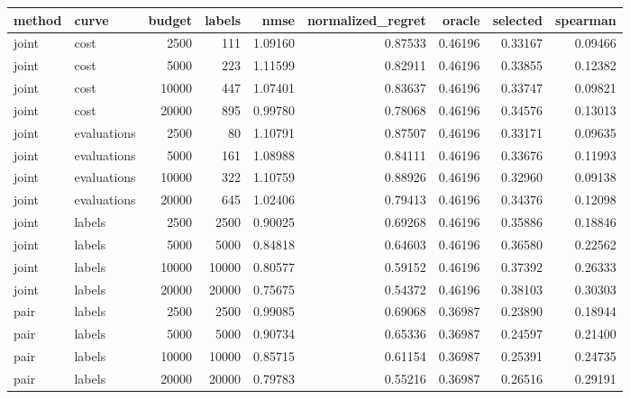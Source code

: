 \begin{tabular}{llrrrrrrr}
\toprule
method & curve & budget & labels & nmse & normalized_regret & oracle & selected & spearman \\
\midrule
joint & cost & 2500 & 111 & 1.09160 & 0.87533 & 0.46196 & 0.33167 & 0.09466 \\
joint & cost & 5000 & 223 & 1.11599 & 0.82911 & 0.46196 & 0.33855 & 0.12382 \\
joint & cost & 10000 & 447 & 1.07401 & 0.83637 & 0.46196 & 0.33747 & 0.09821 \\
joint & cost & 20000 & 895 & 0.99780 & 0.78068 & 0.46196 & 0.34576 & 0.13013 \\
joint & evaluations & 2500 & 80 & 1.10791 & 0.87507 & 0.46196 & 0.33171 & 0.09635 \\
joint & evaluations & 5000 & 161 & 1.08988 & 0.84111 & 0.46196 & 0.33676 & 0.11993 \\
joint & evaluations & 10000 & 322 & 1.10759 & 0.88926 & 0.46196 & 0.32960 & 0.09138 \\
joint & evaluations & 20000 & 645 & 1.02406 & 0.79413 & 0.46196 & 0.34376 & 0.12098 \\
joint & labels & 2500 & 2500 & 0.90025 & 0.69268 & 0.46196 & 0.35886 & 0.18846 \\
joint & labels & 5000 & 5000 & 0.84818 & 0.64603 & 0.46196 & 0.36580 & 0.22562 \\
joint & labels & 10000 & 10000 & 0.80577 & 0.59152 & 0.46196 & 0.37392 & 0.26333 \\
joint & labels & 20000 & 20000 & 0.75675 & 0.54372 & 0.46196 & 0.38103 & 0.30303 \\
pair & labels & 2500 & 2500 & 0.99085 & 0.69068 & 0.36987 & 0.23890 & 0.18944 \\
pair & labels & 5000 & 5000 & 0.90734 & 0.65336 & 0.36987 & 0.24597 & 0.21400 \\
pair & labels & 10000 & 10000 & 0.85715 & 0.61154 & 0.36987 & 0.25391 & 0.24735 \\
pair & labels & 20000 & 20000 & 0.79783 & 0.55216 & 0.36987 & 0.26516 & 0.29191 \\
\bottomrule
\end{tabular}
